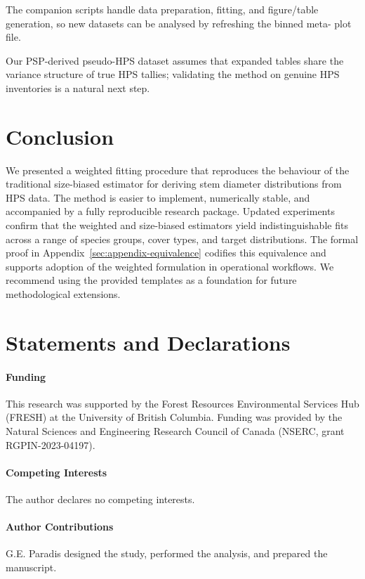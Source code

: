 \documentclass[12pt]{article}
\begin{document}
The companion scripts handle data preparation, fitting, and figure/table
generation, so new datasets can be analysed by refreshing the binned meta-
plot file.

Our PSP-derived pseudo-HPS dataset assumes that expanded tables share the
variance structure of true HPS tallies; validating the method on genuine HPS
inventories is a natural next step.

\section{Conclusion}

We presented a weighted fitting procedure that reproduces the behaviour of the
traditional size-biased estimator for deriving stem diameter distributions from
HPS data. The method is easier to implement, numerically stable, and accompanied
by a fully reproducible research package. Updated experiments confirm that the
weighted and size-biased estimators yield indistinguishable fits across a range
of species groups, cover types, and target distributions. The formal proof in
Appendix~\ref{sec:appendix-equivalence} codifies this equivalence and supports
adoption of the weighted formulation in operational workflows. We recommend
using the provided templates as a foundation for future methodological
extensions.

\section*{Statements and Declarations}
\paragraph{Funding} This research was supported by the Forest Resources Environmental Services Hub (FRESH) at the University of British Columbia. Funding was provided by the Natural Sciences and Engineering Research Council of Canada (NSERC, grant RGPIN-2023-04197).\\
\paragraph{Competing Interests} The author declares no competing interests.\\
\paragraph{Author Contributions} G.E. Paradis designed the study, performed the analysis, and prepared the manuscript.\\
\end{document}
